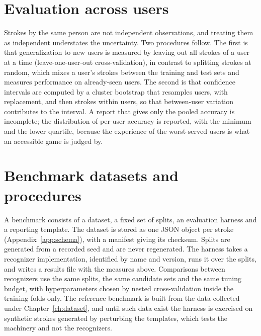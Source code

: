 \section{Evaluation across users}

Strokes by the same person are not independent observations, and treating them as independent understates the uncertainty. Two procedures follow. The first is that generalization to new users is measured by leaving out all strokes of a user at a time (leave-one-user-out cross-validation), in contrast to splitting strokes at random, which mixes a user's strokes between the training and test sets and measures performance on already-seen users. The second is that confidence intervals are computed by a cluster bootstrap that resamples users, with replacement, and then strokes within users, so that between-user variation contributes to the interval. A report that gives only the pooled accuracy is incomplete; the distribution of per-user accuracy is reported, with the minimum and the lower quartile, because the experience of the worst-served users is what an accessible game is judged by.

\section{Benchmark datasets and procedures}

A benchmark consists of a dataset, a fixed set of splits, an evaluation harness and a reporting template. The dataset is stored as one JSON object per stroke (Appendix~\ref{app:schema}), with a manifest giving its checksum. Splits are generated from a recorded seed and are never regenerated. The harness takes a recognizer implementation, identified by name and version, runs it over the splits, and writes a results file with the measures above. Comparisons between recognizers use the same splits, the same candidate sets and the same tuning budget, with hyperparameters chosen by nested cross-validation inside the training folds only. The reference benchmark is built from the data collected under Chapter~\ref{ch:dataset}, and until such data exist the harness is exercised on synthetic strokes generated by perturbing the templates, which tests the machinery and not the recognizers.\evS
